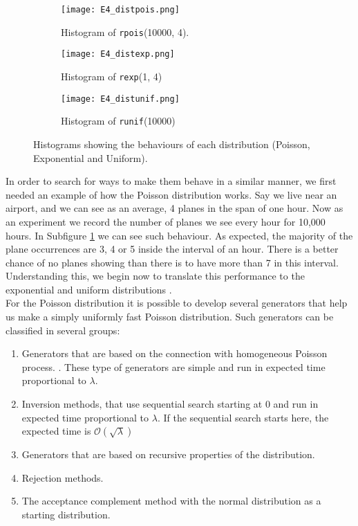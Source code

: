 \documentclass{article}
\begin{document}
\begin{figure}[]
\begin{subfigure}{.33\textwidth}
  \centering
  \texttt{[image: E4\_distpois.png]}  
  \caption{Histogram of \texttt{rpois}(10000, 4).}
  \label{subfig1-1}
\end{subfigure}
\begin{subfigure}{.33\textwidth}
  \centering
  \texttt{[image: E4\_distexp.png]}  
  \caption{Histogram of \texttt{rexp}(1, 4)}
  \label{subfig1-2}
\end{subfigure}
\begin{subfigure}{.33\textwidth}
  \centering
  \texttt{[image: E4\_distunif.png]}  
  \caption{Histogram of \texttt{runif}(10000)}
  \label{subfig1-3}
\end{subfigure}
\caption{Histograms showing the behaviours of each distribution (Poisson, Exponential and Uniform).}
\label{fig1}
\end{figure}


In order to search for ways to make them behave in a similar manner, we first needed an example of how the Poisson distribution works. Say we live near an airport, and we can see as an average, 4 planes in the span of one hour. Now as an experiment we record the number of planes we see every hour for 10,000 hours. In Subfigure \ref{subfig1-1} we can see such behaviour. As expected, the majority of the plane occurrences are 3, 4 or 5 inside the interval of an hour. There is a better chance of no planes showing than there is to have more than 7 in this interval. Understanding this, we begin now to translate this performance to the exponential and uniform distributions \cite{randvariates}.\\

For the Poisson distribution it is possible to develop several generators that help us make a simply uniformly fast Poisson distribution. Such generators can be classified in several groups:

\begin{enumerate}
\item Generators that are based on the connection with homogeneous Poisson process. \cite{atkinson1979computer}. These type of generators are simple and run in expected time proportional to $\lambda$.
\item Inversion methods, that use sequential search starting at 0 and run in expected time proportional to $\lambda$. If the sequential search starts here, the expected time is $\mathcal{O} (\sqrt{\lambda})$ \cite{kemp1990new}
\item Generators that are based on recursive properties of the distribution.
\item Rejection methods.
\item The acceptance complement method with the normal distribution as a starting distribution.
\end{enumerate}
\end{document}
